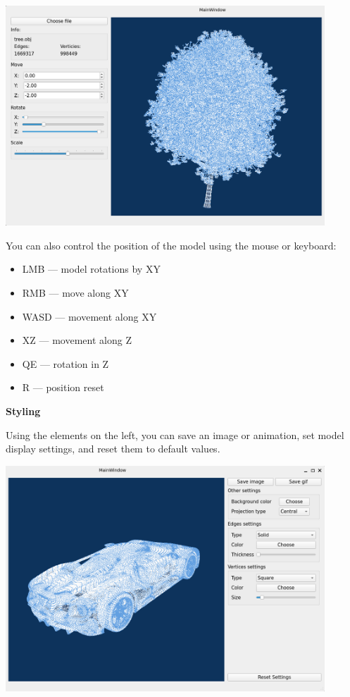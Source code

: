 \documentclass[12pt, letterpaper
]{article}
\begin{document}
\includegraphics[width=4.72361in,height=3.25208in]{vertopal_4bce193b52fb40a8bfdc292270c39a64/media/image2.png}

You can also control the position of the model using the mouse or
keyboard:

\begin{itemize}
\item
  LMB --- model rotations by XY
\item
  RMB --- move along XY
\item
  WASD --- movement along XY
\item
  XZ --- movement along Z
\item
  QE --- rotation in Z
\item
  R --- position reset
\end{itemize}

\textbf{Styling}

Using the elements on the left, you can save an image or animation, set
model display settings, and reset them to default values.

\includegraphics[width=4.72361in,height=3.33264in]{vertopal_4bce193b52fb40a8bfdc292270c39a64/media/image3.png}
\end{document}
